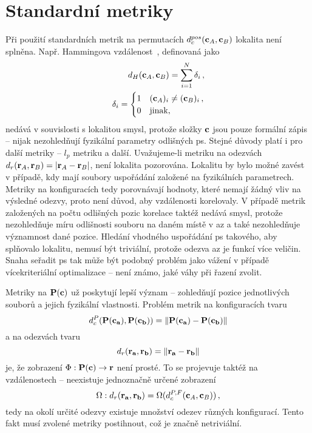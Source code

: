 \section{Standardní metriky} %
Při použití standardních metrik na permutacích $d_c^{pos} (\mathbf{c}_A, \mathbf{c}_B)$ lokalita není splněna. Např. Hammingova vzdálenost~\cite{deza}, definovaná jako 
\begin{align}
	d_H (\mathbf{c}_A, \mathbf{c}_B) = \sum_{i=1}^N \delta_i\,,\\
	\delta_i = 
	\begin{cases}
		1 & (\mathbf{c}_A)_i \neq (\mathbf{c}_B)_i\,,\\
		0 & \text{jinak,}
	\end{cases}
\end{align}
nedává v souvislosti s lokalitou smysl, protože složky $\mathbf{c}$ jsou pouze formální zápis -- nijak nezohledňují fyzikální parametry odlišných 
\ac{ps}. Stejné důvody platí i pro další metriky -- $l_p$ metriku 
a další. Uvažujeme-li metriku na odezvách $d_r (\mathbf{r}_A, \mathbf{r}_B) = \left|\mathbf{r}_A - \mathbf{r}_B \right|$, není lokalita pozorována. 
Lokalitu by bylo možné zavést v případě, kdy mají soubory uspořádání založené na fyzikálních 
parametrech. Metriky na konfiguracích tedy porovnávají hodnoty, které nemají žádný vliv na výsledné 
odezvy, proto není důvod, aby vzdálenosti korelovaly. V případě metrik založených na počtu odlišných pozic korelace taktéž nedává smysl, protože 
nezohledňuje míru odlišnosti souboru na daném místě v \ac{az} a také nezohledňuje významnost dané pozice. 
Hledání vhodného uspořádání \ac{ps} takového, aby splňovalo lokalitu, nemusí být triviální, protože odezva 
\ac{az} je funkcí více veličin. Snaha seřadit \ac{ps} tak může být podobný problém jako vážení v případě vícekriteriální 
optimalizace -- není známo, jaké váhy při řazení zvolit.

Metriky na $\mathbf{P(c)}$ už poskytují lepší význam -- zohledňují pozice jednotlivých souborů a jejich fyzikální vlastnosti. 
Problém metrik na konfiguracích tvaru
\begin{equation}
	d_c^P (\mathbf{P(c_a), P(c_b)}) = \|\mathbf{P(c_a)}-\mathbf{P(c_b)} \|
\end{equation}
a na odezvách tvaru
\begin{equation}
	d_r (\mathbf{r_a}, \mathbf{r_b}) = \|\mathbf{r_a}-\mathbf{r_b}\|
\end{equation}
je, že zobrazení $\Phi: \mathbf{P(c)} \rightarrow \mathbf{r}$ není prosté. To se projevuje taktéž na vzdálenostech -- neexistuje jednoznačně určené zobrazení 
\begin{equation}
	\Omega: d_r (\mathbf{r_a}, \mathbf{r_b}) = \Omega(d_c^{P,F} (\mathbf{c}_A, \mathbf{c}_B))\,,
\end{equation}
tedy na okolí určité odezvy existuje množství odezev různých konfigurací. Tento fakt musí zvolené metriky postihnout, což je značně netriviální. 

